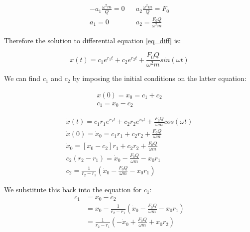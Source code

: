 \begin{align*}
	- a_1 \frac{\omega^2 m}{Q} = 0 &  &  a_2 \frac{\omega^2 m}{Q} = F_0 \\
	a_1 = 0 &  & a_2 = \frac{F_0 Q}{\omega^2 m}
\end{align*}
	
Therefore the solution to differential equation \ref{eq_diff} is:

\begin{equation*}
	x(t) = c_1 e^{r_1 t} + c_2 e^{r_2 t} + \frac{F_0 Q}{\omega^2 m}sin(\omega t)
\end{equation*}

We can find $c_1$ and $c_2$ by imposing the initial conditions on the latter equation:

\begin{align*}
	x(0) = x_0 = c_1 + c_2 \\
	c_1 = x_0 - c_2
\end{align*}

\begin{align*}
	\dot{x}(t) = c_1 r_1 e^{r_1 t} + c_2 r_2 e^{r_2 t} + \frac{F_0 Q}{\omega m} cos(\omega t) \\
	\dot{x}(0) = \dot{x}_0 = c_1 r_1 + c_2 r_2 + \frac{F_0 Q}{\omega m} \\
	\dot{x}_0 = [x_0-c_2] r_1 + c_2 r_2 + \frac{F_0 Q}{\omega m} \\
	c_2(r_2 - r_1) = \dot{x}_0 - \frac{F_0 Q}{\omega m} -x_0 r_1 \\	
	c_2 = \frac{1}{r_2-r_1} \left( \dot{x}_0 - \frac{F_0 Q}{\omega m} - x_0 r_1 \right) 
\end{align*}

We substitute this back into the equation for $c_1$:
\begin{align*}
	c_1 &= x_0 - c_2 \\	
	&= x_0 - \frac{1}{r_2-r_1} \left( \dot{x}_0 - \frac{F_0 Q}{\omega m} - x_0 r_1 \right) \\
	&= \frac{1}{r_2-r_1} \left( -\dot{x}_0 + \frac{F_0 Q}{\omega m} + x_0  r_2  \right)
\end{align*}










